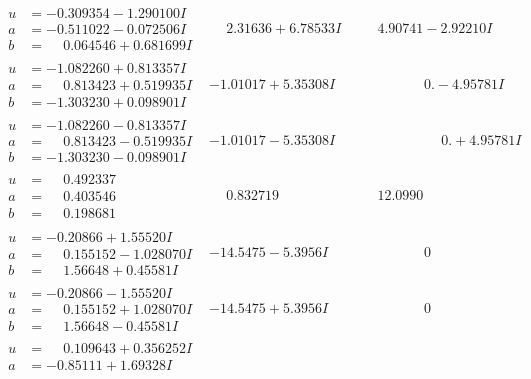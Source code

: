 \documentclass[1p]{elsarticle_modified}
\theoremstyle{definition}
\begin{document}
$$\begin{array}{c|c|c}
\begin{aligned}
u &= -0.309354 - 1.290100 I \\
a &= -0.511022 - 0.072506 I \\
b &= \phantom{-}0.064546 + 0.681699 I\end{aligned}
 & \phantom{-}2.31636 + 6.78533 I & \phantom{-}4.90741 - 2.92210 I \\ \hline\begin{aligned}
u &= -1.082260 + 0.813357 I \\
a &= \phantom{-}0.813423 + 0.519935 I \\
b &= -1.303230 + 0.098901 I\end{aligned}
 & -1.01017 + 5.35308 I & \phantom{-0.000000 } 0. - 4.95781 I \\ \hline\begin{aligned}
u &= -1.082260 - 0.813357 I \\
a &= \phantom{-}0.813423 - 0.519935 I \\
b &= -1.303230 - 0.098901 I\end{aligned}
 & -1.01017 - 5.35308 I & \phantom{-0.000000 -}0. + 4.95781 I \\ \hline\begin{aligned}
u &= \phantom{-}0.492337\phantom{ +0.000000I} \\
a &= \phantom{-}0.403546\phantom{ +0.000000I} \\
b &= \phantom{-}0.198681\phantom{ +0.000000I}\end{aligned}
 & \phantom{-}0.832719\phantom{ +0.000000I} & \phantom{-}12.0990\phantom{ +0.000000I} \\ \hline\begin{aligned}
u &= -0.20866 + 1.55520 I \\
a &= \phantom{-}0.155152 - 1.028070 I \\
b &= \phantom{-}1.56648 + 0.45581 I\end{aligned}
 & -14.5475 - 5.3956 I & \phantom{-0.000000 } 0 \\ \hline\begin{aligned}
u &= -0.20866 - 1.55520 I \\
a &= \phantom{-}0.155152 + 1.028070 I \\
b &= \phantom{-}1.56648 - 0.45581 I\end{aligned}
 & -14.5475 + 5.3956 I & \phantom{-0.000000 } 0 \\ \hline\begin{aligned}
u &= \phantom{-}0.109643 + 0.356252 I \\
a &= -0.85111 + 1.69328 I \\

\end{aligned}
\end{array}$$
\end{document}
